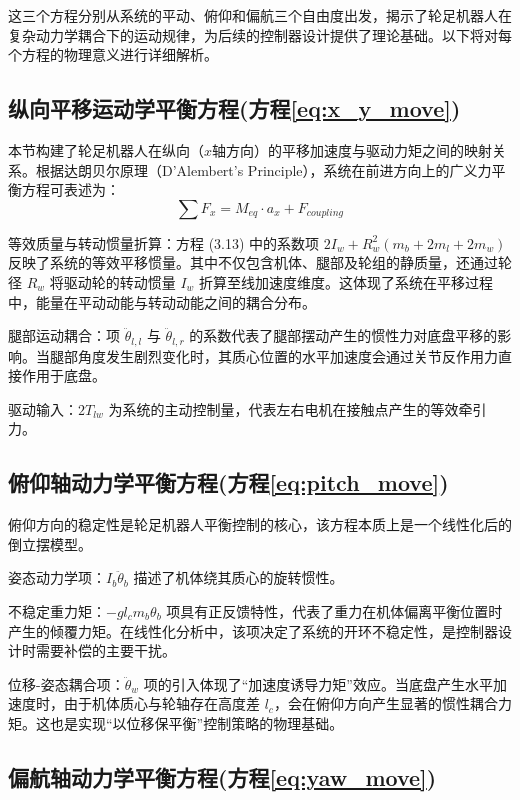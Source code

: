 \documentclass[
  oneside,
  degree=bachelor,
  fullwidthstop=false,
  fontset=fandol,
  times=false,
  minted=true,
  biblatex=true,
]{tongjithesis}
\begin{document}
这三个方程分别从系统的平动、俯仰和偏航三个自由度出发，揭示了轮足机器人在复杂动力学耦合下的运动规律，为后续的控制器设计提供了理论基础。以下将对每个方程的物理意义进行详细解析。

\subsection{纵向平移运动学平衡方程(方程\ref{eq:x_y_move})}

本节构建了轮足机器人在纵向（$x$轴方向）的平移加速度与驱动力矩之间的映射关系。根据达朗贝尔原理（D'Alembert's Principle），系统在前进方向上的广义力平衡方程可表述为：$$\sum F_x = M_{eq} \cdot a_x + F_{coupling}$$

等效质量与转动惯量折算：方程 (3.13) 中的系数项 $2I_w + R_{w}^{2}(m_b + 2m_l + 2m_w)$ 反映了系统的等效平移惯量。其中不仅包含机体、腿部及轮组的静质量，还通过轮径 $R_w$ 将驱动轮的转动惯量 $I_w$ 折算至线加速度维度。这体现了系统在平移过程中，能量在平动动能与转动动能之间的耦合分布。

腿部运动耦合：项 $\ddot{\theta}_{l,l}$ 与 $\ddot{\theta}_{l,r}$ 的系数代表了腿部摆动产生的惯性力对底盘平移的影响。当腿部角度发生剧烈变化时，其质心位置的水平加速度会通过关节反作用力直接作用于底盘。

驱动输入：$2T_{lw}$ 为系统的主动控制量，代表左右电机在接触点产生的等效牵引力。

\subsection{俯仰轴动力学平衡方程(方程\ref{eq:pitch_move})}

俯仰方向的稳定性是轮足机器人平衡控制的核心，该方程本质上是一个线性化后的倒立摆模型。

姿态动力学项：$I_b \ddot{\theta}_b$ 描述了机体绕其质心的旋转惯性。

不稳定重力矩：$-g l_c m_b \theta_b$ 项具有正反馈特性，代表了重力在机体偏离平衡位置时产生的倾覆力矩。在线性化分析中，该项决定了系统的开环不稳定性，是控制器设计时需要补偿的主要干扰。

位移-姿态耦合项：$\ddot{\theta}_{w}$ 项的引入体现了“加速度诱导力矩”效应。当底盘产生水平加速度时，由于机体质心与轮轴存在高度差 $l_c$，会在俯仰方向产生显著的惯性耦合力矩。这也是实现“以位移保平衡”控制策略的物理基础。

\subsection{偏航轴动力学平衡方程(方程\ref{eq:yaw_move})}
\end{document}

